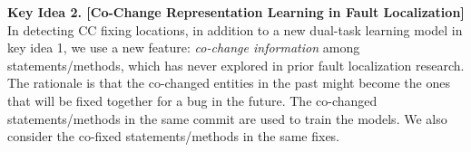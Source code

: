 





{\bf Key Idea 2. [Co-Change Representation Learning in Fault
    Localization]} In detecting CC fixing locations, in addition to a
new dual-task learning model in key idea 1, we use a new feature:
{\em co-change information} among statements/methods, which has never
explored in prior fault localization research. The rationale
is that the co-changed entities in the past might become the ones that
will be fixed together for a bug in the future.
%
The co-changed statements/methods in the same commit are used to train
the models. We also consider the co-fixed statements/methods in
the same fixes.


